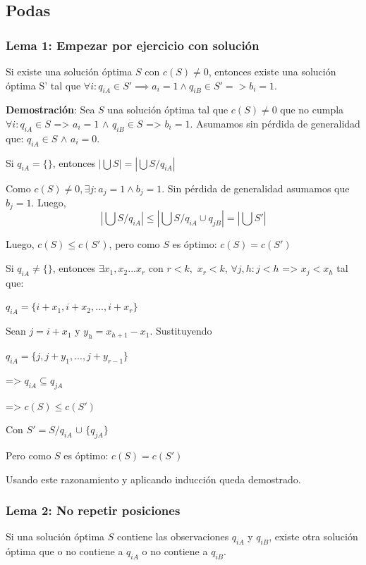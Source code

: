 \documentclass{article}
\begin{document}
\subsection{Podas}

\subsubsection{Lema 1: Empezar por ejercicio con solución}

Si existe una solución óptima $S$ con $c(S) \neq 0$, entonces existe una solución óptima S' tal que
$ \forall i:q_{iA}\in S' \implies a_i=1 \land q_{iB}\in S' => b_i=1$.

\textbf{Demostración}: 
Sea $S$ una solución óptima tal que $c(S)\neq0$ que no cumpla $\forall i:q_{iA}\in S$ => $a_i=1$ $\wedge$ $q_{iB}\in S$ => $b_i=1$. Asumamos sin pérdida de generalidad que:
$q_{iA}\in S$ $\wedge$ $a_i=0$.

Si $q_{iA}=\{\}$, entonces $|\bigcup S|=|\bigcup S/q_{iA}|$

Como $c(S)\neq 0, \exists j:a_j=1 \land b_j=1$. Sin pérdida de generalidad asumamos que $b_j=1$. Luego,
$$|\bigcup S/q_{iA}|\leq|\bigcup S/q_{iA}\cup q_{jB}|=|\bigcup S'|$$

Luego, $c(S)\leq c(S')$, pero como $S$ es óptimo: $c(S)= c(S')$

Si $q_{iA}\neq\{\}$, entonces $\exists x_1, x_2...x_r$ con $r<k,$ $x_r<k$, $\forall j,h:j<h$ => $x_j<x_h$ tal que:

$q_{iA}=\{i+x_1,i+x_2,...,i+x_r\}$

Sean $j=i+x_1$ y $y_h=x_{h+1}-x_1$. Sustituyendo

$q_{iA}= \{j,j+y_1,...,j+y_{r-1}\}$

=> $q_{iA}\subseteq q_{jA}$

=> $c(S)\leq c(S')$

Con $S'=S/q_{iA}$  $\cup$ $\{q_{jA}\}$

Pero como $S$ es óptimo: $c(S)= c(S')$

Usando este razonamiento y aplicando inducción queda demostrado.


\subsubsection{Lema 2: No repetir posiciones}

Si una solución óptima $S$ contiene las observaciones $q_{iA}$ y $q_{iB}$, existe otra solución óptima que o no contiene a $q_{iA}$ o no contiene a $q_{iB}$.
\end{document}
